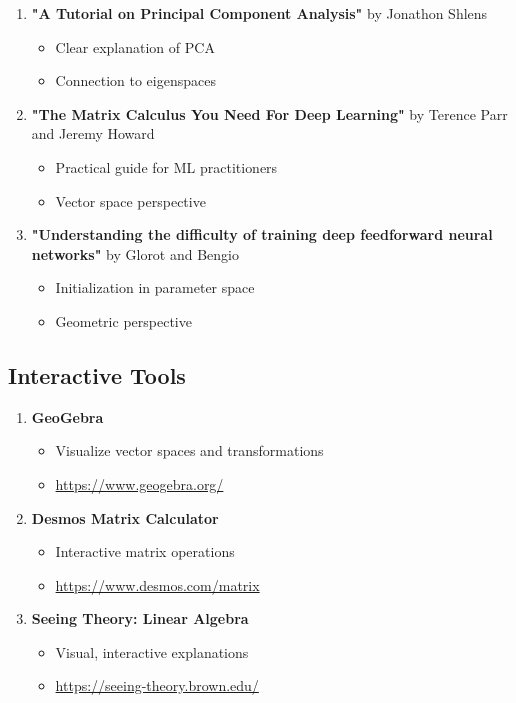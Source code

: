 \documentclass[12pt,a4paper]{article}
\theoremstyle{definition}
\begin{document}
\begin{enumerate}
    \item \textbf{"A Tutorial on Principal Component Analysis"} by Jonathon Shlens
    \begin{itemize}
        \item Clear explanation of PCA
        \item Connection to eigenspaces
    \end{itemize}
    
    \item \textbf{"The Matrix Calculus You Need For Deep Learning"} by Terence Parr and Jeremy Howard
    \begin{itemize}
        \item Practical guide for ML practitioners
        \item Vector space perspective
    \end{itemize}
    
    \item \textbf{"Understanding the difficulty of training deep feedforward neural networks"} by Glorot and Bengio
    \begin{itemize}
        \item Initialization in parameter space
        \item Geometric perspective
    \end{itemize}
\end{enumerate}

\subsection{Interactive Tools}

\begin{enumerate}
    \item \textbf{GeoGebra}
    \begin{itemize}
        \item Visualize vector spaces and transformations
        \item \url{https://www.geogebra.org/}
    \end{itemize}
    
    \item \textbf{Desmos Matrix Calculator}
    \begin{itemize}
        \item Interactive matrix operations
        \item \url{https://www.desmos.com/matrix}
    \end{itemize}
    
    \item \textbf{Seeing Theory: Linear Algebra}
    \begin{itemize}
        \item Visual, interactive explanations
        \item \url{https://seeing-theory.brown.edu/}
    \end{itemize}
\end{enumerate}
\end{document}
